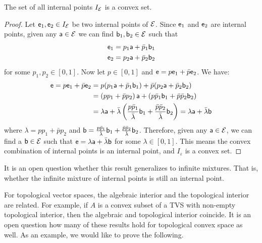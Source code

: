 \begin{mathSection}
\begin{prop}
	The set of all internal points $I_{\Ens}$ is a convex set.
\end{prop}
\begin{proof}
Let $\ens_1, \ens_2 \in I_{\Ens}$ be two internal points of $\Ens$. Since $\ens_1$ and $\ens_2$ are internal points, given any $\ens[a] \in \Ens$ we can find $\ens[b]_1, \ens[b]_2 \in \Ens$ such that 
\begin{equation}
	\begin{aligned}
	\ens_1 & =p_1 \ens[a]+\bar{p}_1 \ens[b]_1 \\
	\ens_2 & =p_2 \ens[a]+\bar{p}_2 \ens[b]_2
	\end{aligned}
\end{equation}
for some $p_1, p_2 \in [0,1]$. Now let $p \in [0,1]$ and $\ens = p \ens_1+\bar{p} \ens_2$. We have:
\begin{equation}
\begin{aligned}
	\ens = p \ens_1+\bar{p} \ens_2 &= p(p_1 \ens[a]+\bar{p}_1 \ens[b]_1) + \bar{p} (p_2 \ens[a]+\bar{p}_2 \ens[b]_2)\\
	&=\left(p p_1+\bar{p} p_2\right) \ens[a]+\left(p \bar{p}_{1} \ens[b]_1+\bar{p} \bar{p}_{2} \ens[b]_2\right) \\
	&=\lambda \ens[a] + \bar{\lambda} \left(\frac{p \bar{p}_{1}}{\bar{\lambda}} \ens[b]_1+\frac{\bar{p} \bar{p}_{2}}{\bar{\lambda}} \ens[b]_2\right) = \lambda \ens[a] + \bar{\lambda} \ens[b] \\
\end{aligned}
\end{equation}
where $\lambda = p p_1+\bar{p} p_2$ and $\ens[b] = \frac{p \bar{p}_{1}}{\bar{\lambda}} \ens[b]_1+\frac{\bar{p} \bar{p}_{2}}{\bar{\lambda}} \ens[b]_2$. Therefore, given any $\ens[a] \in \Ens$, we can find a $\ens[b] \in \Ens$ such that $\ens = \lambda \ens[a] + \bar{\lambda} \ens[b]$ for some $\lambda \in [0,1]$. This means the convex combination of internal points is an internal point, and $I_{\varepsilon}$ is a convex set.
\end{proof}

\begin{remark}
	It is an open question whether this result generalizes to infinite mixtures. That is, whether the infinite mixture of internal points is still an internal point.
\end{remark}
\end{mathSection}

For topological vector spaces, the algebraic interior and the topological interior are related. For example, if $A$ is a convex subset of a TVS with non-empty topological interior, then the algebraic and topological interior coincide. It is an open question how many of these results hold for topological convex space as well. As an example, we would like to prove the following.

